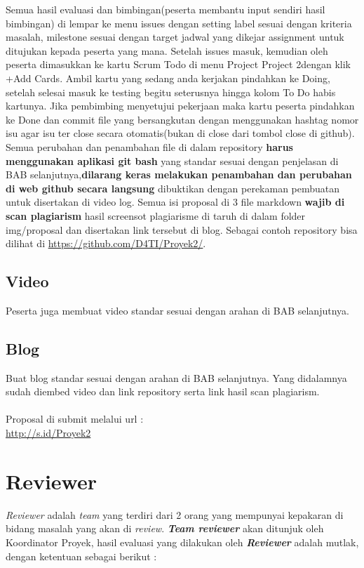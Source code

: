 Semua	 hasil	evaluasi	dan	 bimbingan(peserta	membantu	input	 sendiri	 hasil	 bimbingan) di	lempar	 ke	 menu	 issues dengan	 setting	 label	 sesuai	 dengan	 kriteria	 masalah,	 milestone	
sesuai	dengan	target	jadwal	yang	dikejar	assignment	untuk	ditujukan	kepada	peserta	yang	mana.	 Setelah	issues	masuk,	 kemudian	 oleh	 peserta	 dimasukkan	 ke	 kartu	 Scrum	 Todo	 di	menu	Project \textrightarrow Project	2dengan	klik	+Add	Cards. Ambil	kartu	yang	sedang	anda	kerjakan	pindahkan	ke	Doing,	setelah	selesai	masuk	ke	testing	begitu	seterusnya	hingga	kolom	To	Do	habis	 kartunya.	 Jika	pembimbing	menyetujui	pekerjaan	maka	 kartu	peserta	pindahkan	 ke	Done	dan	commit	file	yang	bersangkutan	dengan	menggunakan	hashtag	nomor	isu	agar	isu	
ter	 close	 secara	 otomatis(bukan	 di	 close	 dari	 tombol	 close	 di	 github).	 Semua	 perubahan	dan	 penambahan	 file	 di	 dalam	 repository \textbf{harus	 menggunakan	 aplikasi	 git	 bash} yang	standar	 sesuai	 dengan	 penjelasan	 di	 BAB	 selanjutnya,\textbf{dilarang	 keras	 melakukan	penambahan	 dan	 perubahan	 di	 web	 github	 secara	 langsung} dibuktikan	 dengan	perekaman	 pembuatan	 untuk	 disertakan	 di	 video	 log. Semua	 isi	 proposal	 di	 3	 file markdown \textbf{wajib	di	scan	plagiarism} 	hasil	screensot	plagiarisme	di	 taruh di	dalam	 folder	img/proposal dan	disertakan	link	tersebut	di	blog. Sebagai	contoh	repository	bisa	dilihat	di	
\url{https://github.com/D4TI/Proyek2/}.

\subsection{Video}
Peserta	juga	membuat	video	standar	sesuai	dengan	arahan	di	BAB selanjutnya.

\subsection{Blog}
Buat	 blog standar	 sesuai	 dengan	 arahan	 di	 BAB	 selanjutnya. Yang	 didalamnya	 sudah	diembed	video	dan	link	repository	serta	link	hasil	scan	plagiarism.
\\
\\
Proposal	di	submit	melalui	url	:
\\ \url{http://s.id/Proyek2}
\section{Reviewer}

\textit{Reviewer} adalah \textit{ team} yang	 terdiri	 dari	 2 orang	 yang	 mempunyai	 kepakaran	 di	 bidang	masalah	yang	akan	di	\textit{review}. \textit{\textbf{Team reviewer}} akan	ditunjuk	oleh	Koordinator	Proyek,	hasil evaluasi	yang	dilakukan	oleh \textit{\textbf{Reviewer}} adalah	mutlak,	dengan	ketentuan	sebagai	berikut	:

